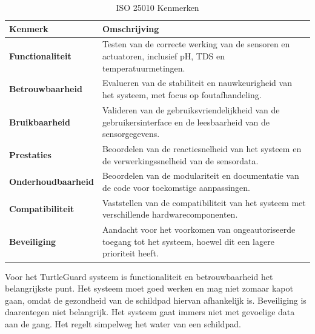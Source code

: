 \documentclass[a4paper]{report}
\newcommand{\turtleguard}{\mbox{TurtleGuard\texttrademark}\xspace}
\begin{document}
\begin{table}[h]
  \centering
  \begin{tabularx}{\textwidth}{|l|X|}
    \hline
    \textbf{Kenmerk} & \textbf{Omschrijving} \\
    \hline 
    \textbf{Functionaliteit} & Testen van de correcte werking van de sensoren en actuatoren, inclusief pH, TDS en temperatuurmetingen. \\ 
    \hline
    \textbf{Betrouwbaarheid} & Evalueren van de stabiliteit en nauwkeurigheid van het systeem, met focus op foutafhandeling. \\ 
    \hline
    \textbf{Bruikbaarheid} & Valideren van de gebruiksvriendelijkheid van de gebruikersinterface en de leesbaarheid van de sensorgegevens. \\ 
    \hline
    \textbf{Prestaties} & Beoordelen van de reactiesnelheid van het systeem en de verwerkingssnelheid van de sensordata. \\
    \hline
    \textbf{Onderhoudbaarheid} & Beoordelen van de modulariteit en documentatie van de code voor toekomstige aanpassingen. \\
    \hline
    \textbf{Compatibiliteit} & Vaststellen van de compatibiliteit van het systeem met verschillende hardwarecomponenten. \\
    \hline
    \textbf{Beveiliging} & Aandacht voor het voorkomen van ongeautoriseerde toegang tot het systeem, hoewel dit een lagere prioriteit heeft. \\
    \hline
  \end{tabularx}
  \caption{ISO 25010 Kenmerken}
  \label{tab:25010_specs}
\end{table}


Voor het \turtleguard systeem is functionaliteit en betrouwbaarheid het belangrijkste punt. 
Het systeem moet goed werken en mag niet zomaar kapot gaan, omdat de gezondheid van de schildpad hiervan afhankelijk is.
Beveiliging is daarentegen niet belangrijk. Het systeem gaat immers niet met gevoelige data aan de gang. Het regelt simpelweg het water van een schildpad.
\end{document}
